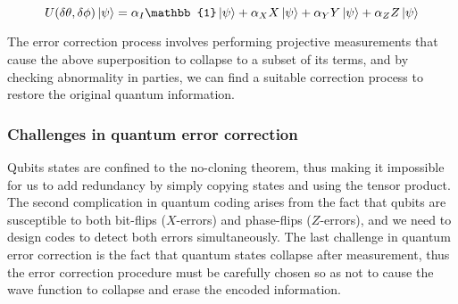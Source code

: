 \[
    U(\delta \theta, \delta \phi) \ket{\psi} = \alpha_{I} \mathbb{1} \ket{\psi} + \alpha_{X} X \ket{\psi} + \alpha_{Y} Y \ket{\psi} + \alpha_{Z} Z \ket{\psi}
\]

The error correction process involves performing projective measurements that cause the above superposition to collapse to a subset of its terms, and by checking abnormality in parties, we can find a suitable correction process to restore the original quantum information.

\subsubsection{Challenges in quantum error correction}

Qubits states are confined to the no-cloning theorem, thus making it impossible for us to add redundancy by simply copying states and using the tensor product. The second complication in quantum coding arises from the fact that qubits are susceptible to both bit-flips ($X$-errors) and phase-flips ($Z$-errors),  and we need to design codes to detect both errors simultaneously. The last challenge in quantum error correction is the fact that quantum states collapse after measurement, thus the error correction procedure must be carefully chosen so as not to cause the wave function to collapse and erase the encoded information.
